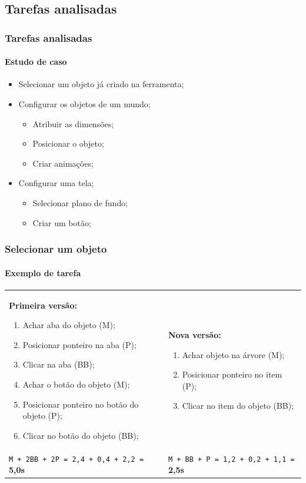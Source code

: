 \documentclass[]{beamer}
\begin{document}
   \subsection{Tarefas analisadas}
   \begin{frame}
      \frametitle{Tarefas analisadas}
      \framesubtitle{Estudo de caso}

      \begin{itemize}
         \item Selecionar um objeto já criado na ferramenta;
         \item Configurar os objetos de um mundo;
            \begin{itemize}
               \item Atribuir as dimensões;
               \item Posicionar o objeto;
               \item Criar animações;
            \end{itemize}
         \item Configurar uma tela;
            \begin{itemize}
               \item Selecionar plano de fundo;
               \item Criar um botão;
            \end{itemize}
      \end{itemize}
   \end{frame}

   \begin{frame}
      \frametitle{Selecionar um objeto}
      \framesubtitle{Exemplo de tarefa}
      {\small
      \begin{tabularx}{\textwidth}{X  X}
         \textbf{Primeira versão:}
         \begin{enumerate}
            \item Achar aba do objeto (M);
            \item Posicionar ponteiro na aba (P);
            \item Clicar na aba (BB);
            \item Achar o botão do objeto (M);
            \item Posicionar ponteiro no botão do objeto (P);
            \item Clicar no botão do objeto (BB);
         \end{enumerate}
         &
         \textbf{Nova versão:}
         \begin{enumerate}
            \item Achar objeto na árvore (M);
            \item Posicionar ponteiro no item (P);
            \item Clicar no item do objeto (BB);
         \end{enumerate}
         \\
         \texttt{M + 2BB + 2P = 2,4 + 0,4 + 2,2 =} \textbf{5,0s}
         &
         \texttt{M + BB + P = 1,2 + 0,2 + 1,1 =} \textbf{2,5s}
         \\
      \end{tabularx}}
   \end{frame}
\end{document}
